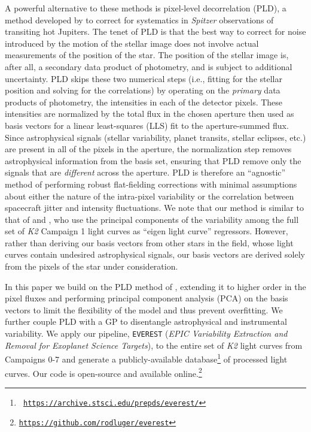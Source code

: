 \documentclass[]{emulateapj}
\newcommand{\note}[1]{{\color{red} #1}}
\begin{document}
A powerful alternative to these methods is pixel-level decorrelation (PLD), a method developed
by \cite{DEM15} to correct for systematics in \emph{Spitzer} observations of transiting
hot Jupiters. The tenet of PLD is that the best way to correct for noise introduced by
the motion of the stellar image does not involve actual measurements of the position
of the star. The position of the stellar image is, after all, a secondary data product
of photometry, and is subject to additional uncertainty.
PLD skips these two numerical steps (i.e., fitting for the stellar position and solving
for the correlations) by operating on the \emph{primary} data products of photometry, the
intensities in each of the detector pixels. 
These intensities are normalized by the
total flux in the chosen aperture then used as basis vectors for a linear least-squares 
(LLS) fit to the aperture-summed flux. Since astrophysical signals (stellar variability,
planet transits, stellar eclipses, etc.) are present in all of the pixels in the aperture,
the normalization step removes astrophysical information from the basis set, ensuring
that PLD remove only the signals that are \emph{different} across the aperture. PLD is
therefore an ``agnostic'' method of performing robust flat-fielding corrections with
minimal assumptions about either the nature of the intra-pixel variability or the correlation 
between spacecraft jitter and intensity fluctuations. We note that our method is similar 
to that of \cite{DFM15} and \cite{MON15}, who use the principal components of the variability 
among the full set of \emph{K2} Campaign 1 light curves as ``eigen light curve'' regressors.
However, rather than deriving our basis vectors from other stars in the field, whose
light curves contain undesired astrophysical signals, our basis vectors are derived
solely from the pixels of the star under consideration.

In this paper we build on the PLD method of \cite{DEM15}, extending it to higher order
in the pixel fluxes and performing principal component analysis (PCA) on the basis
vectors to limit the flexibility of the model and thus prevent overfitting. We further 
couple PLD with a GP to 
disentangle astrophysical and instrumental variability. We apply our pipeline, \texttt{EVEREST}
(\emph{EPIC Variability Extraction and Removal for
Exoplanet Science Targets}), to the entire set of \emph{K2} light curves from Campaigns 0-7 and generate a 
publicly-available database\footnote{\texttt{\note{\url{https://archive.stsci.edu/prepds/everest/}}}}
of processed light curves. Our code is open-source and
available online.\footnote{\texttt{\url{https://github.com/rodluger/everest}}}
\end{document}
